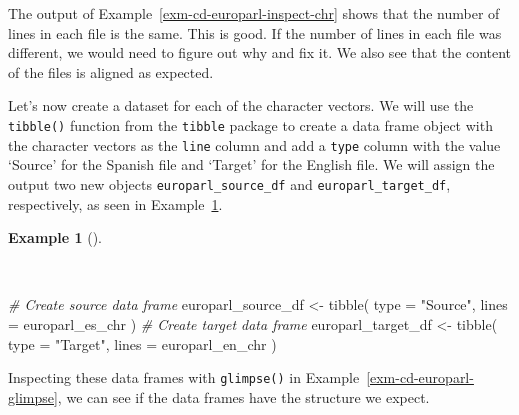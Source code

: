 \documentclass[
  letterpaper,
]{latex/krantz}
\newenvironment{Shaded}{\begin{snugshade}}{\end{snugshade}}
\newcommand{\AttributeTok}[1]{\textcolor[rgb]{0.00,0.00,0.00}{#1}}
\newcommand{\CommentTok}[1]{\textcolor[rgb]{0.00,0.00,0.00}{\textit{#1}}}
\newcommand{\FunctionTok}[1]{\textcolor[rgb]{0.00,0.00,0.00}{#1}}
\newcommand{\NormalTok}[1]{\textcolor[rgb]{0.00,0.00,0.00}{#1}}
\newcommand{\OtherTok}[1]{\textcolor[rgb]{0.00,0.00,0.00}{#1}}
\newcommand{\StringTok}[1]{\textcolor[rgb]{0.00,0.00,0.00}{#1}}
\theoremstyle{definition}
\newtheorem{example}{Example}[chapter]
\theoremstyle{remark}
\begin{document}
The output of Example~\ref{exm-cd-europarl-inspect-chr} shows that the
number of lines in each file is the same. This is good. If the number of
lines in each file was different, we would need to figure out why and
fix it. We also see that the content of the files is aligned as
expected.

Let's now create a dataset for each of the character vectors. We will
use the \texttt{tibble()} function from the \texttt{tibble} package to
create a data frame object with the character vectors as the
\texttt{line} column and add a \texttt{type} column with the value
`Source' for the Spanish file and `Target' for the English file. We will
assign the output two new objects \texttt{europarl\_source\_df} and
\texttt{europarl\_target\_df}, respectively, as seen in
Example~\ref{exm-cd-europarl-df}.

\begin{example}[]\protect\hypertarget{exm-cd-europarl-df}{}\label{exm-cd-europarl-df}

~

\begin{Shaded}
\begin{Highlighting}[]
\CommentTok{\# Create source data frame}
\NormalTok{europarl\_source\_df }\OtherTok{\textless{}{-}}
  \FunctionTok{tibble}\NormalTok{(}
    \AttributeTok{type =} \StringTok{"Source"}\NormalTok{,}
    \AttributeTok{lines =}\NormalTok{ europarl\_es\_chr}
\NormalTok{  )}
\CommentTok{\# Create target data frame}
\NormalTok{europarl\_target\_df }\OtherTok{\textless{}{-}}
  \FunctionTok{tibble}\NormalTok{(}
    \AttributeTok{type =} \StringTok{"Target"}\NormalTok{,}
    \AttributeTok{lines =}\NormalTok{ europarl\_en\_chr}
\NormalTok{  )}
\end{Highlighting}
\end{Shaded}

\end{example}

Inspecting these data frames with \texttt{glimpse()} in
Example~\ref{exm-cd-europarl-glimpse}, we can see if the data frames
have the structure we expect.
\end{document}
